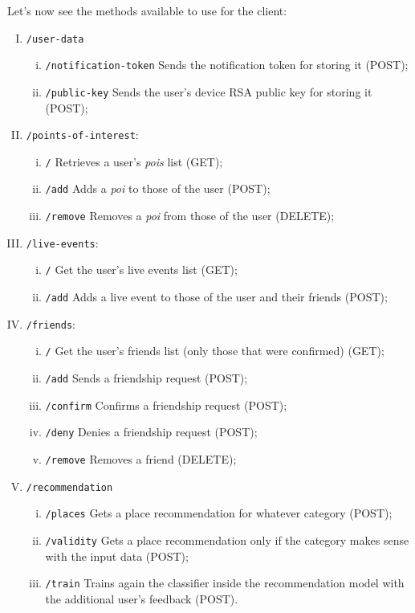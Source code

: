 \documentclass[../../main]{subfiles}
\begin{document}
Let's now see the methods available to use for the client:
\begin{enumerate}[I)]
    \item \texttt{/user-data}
    \begin{enumerate}[i)]
        \item \texttt{/notification-token} Sends the notification token for storing it (POST);
        \item \texttt{/public-key} Sends the user's device RSA public key for storing it (POST);
    \end{enumerate}

    \item \texttt{/points-of-interest}:
    \begin{enumerate}[i)]
        \item \texttt{/} Retrieves a user's \textit{pois} list (GET);
        \item \texttt{/add} Adds a \textit{poi} to those of the user (POST);
        \item \texttt{/remove} Removes a \textit{poi} from those of the user (DELETE);
    \end{enumerate}

    \item \texttt{/live-events}:
    \begin{enumerate}[i)]
        \item \texttt{/} Get the user's live events list (GET);
        \item \texttt{/add} Adds a live event to those of the user and their friends (POST);
    \end{enumerate}

    \item \texttt{/friends}:
    \begin{enumerate}[i)]
        \item \texttt{/} Get the user's friends list (only those that were confirmed) (GET);
        \item \texttt{/add} Sends a friendship request (POST);
        \item \texttt{/confirm} Confirms a friendship request (POST);
        \item \texttt{/deny} Denies a friendship request (POST);
        \item \texttt{/remove} Removes a friend (DELETE);
    \end{enumerate}
    
    \item \texttt{/recommendation}
    \begin{enumerate}[i)]
        \item \texttt{/places} Gets a place recommendation for whatever category (POST);
        \item \texttt{/validity} Gets a place recommendation only if the category makes sense with the input data (POST);
        \item \texttt{/train} Trains again the classifier inside the recommendation model with the additional user's feedback (POST).
    \end{enumerate}
\end{enumerate}
\end{document}
